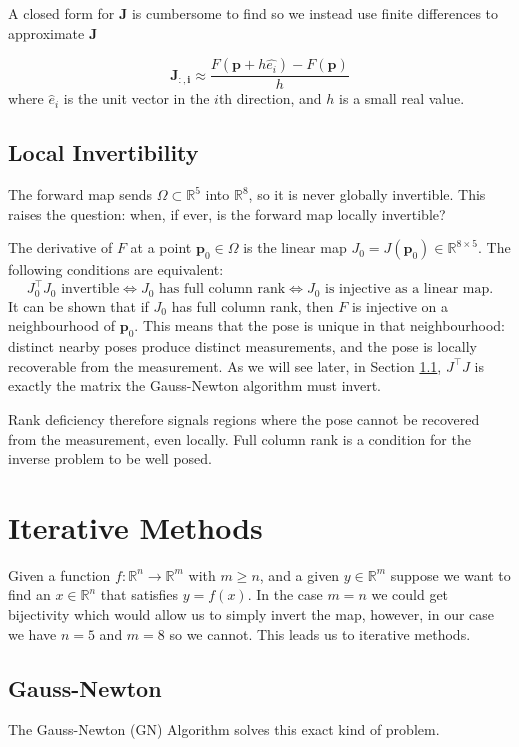 A closed form for $\mathbf{J}$ is cumbersome to find so we instead use finite differences to approximate $\mathbf{J}$

\begin{equation}\label{eq:jacobian}
\mathbf{J_{:,i}} \approx \frac{F\left(\mathbf{p} + h  \hat{e_i} \right) - F(\mathbf{p})}{h}
\end{equation}
where $\hat{e}_i$ is the unit vector in the $i$th direction, and $h$ is a small real value.

\subsection{Local Invertibility}
The forward map sends $\Omega \subset \mathbb{R}^5$ into $\mathbb{R}^8$, so it is never
globally invertible. This raises the question: when, if ever, is the forward map
locally invertible?

The derivative of $F$ at a point $\mathbf{p}_0 \in \Omega$ is the linear map
$J_0 = J(\mathbf{p}_0) \in \mathbb{R}^{8 \times 5}$. The following conditions are
equivalent:
$$
  J_0^\top J_0 \text{ invertible}
  \iff J_0 \text{ has full column rank}
  \iff J_0 \text{ is injective as a linear map.}
$$
It can be shown \cite{mckay2022} that if $J_0$ has full column rank, then $F$ is
injective on a neighbourhood of $\mathbf{p}_0$. This means that the pose is unique
in that neighbourhood: distinct nearby poses produce distinct measurements, and the
pose is locally recoverable from the measurement. As we will see later, in Section \ref{sec:GN}, $J^\top J$ is exactly the matrix the Gauss-Newton algorithm must invert. 

Rank deficiency therefore signals regions where the pose cannot be recovered from
the measurement, even locally. Full column rank is a condition for the inverse
problem to be well posed.

\section{Iterative Methods}
Given a function $f : \mathbb{R}^n \rightarrow \mathbb{R}^m$ with $m \geq n$, and a given $y \in \mathbb{R}^m$ suppose we want to find an $x \in \mathbb{R}^n$ that satisfies $y = f(x)$. In the case $m = n$ we could get bijectivity which would allow us to simply invert the map, however, in our case we have $n = 5$ and $m = 8$ so we cannot. This leads us to iterative methods.

\subsection{Gauss-Newton}\label{sec:GN}
The Gauss-Newton (GN) Algorithm \cite{nocedal2006} solves this exact kind of problem. 

